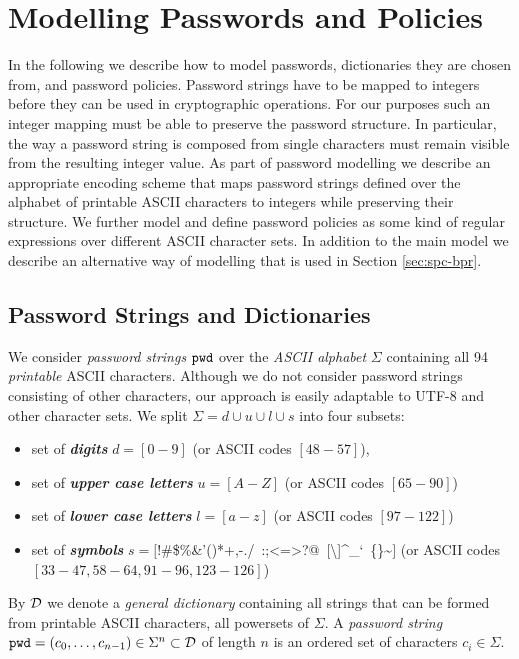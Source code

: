 \section{Modelling Passwords and Policies} \label{sec:passwords}

In the following we describe how to model passwords, dictionaries they are chosen from, and password policies. 
Password strings have to be mapped to integers before they can be used in cryptographic operations. 
For our purposes such an integer mapping must be able to preserve the password structure. 
In particular, the way a password string is composed from single characters must remain visible from the resulting integer value. 
As part of password modelling we describe an appropriate encoding scheme that maps password strings defined over the alphabet of printable \ac{ASCII} characters to integers while preserving their structure. 
We further model and define password policies as some kind of regular expressions over different \ac{ASCII} character sets.
In addition to the main model we describe an alternative way of modelling that is used in Section \ref{sec:spc-bpr}.

\subsection{Password Strings and Dictionaries}
We consider \emph{password strings} $\mathtt{pwd}$ over the \emph{\ac{ASCII}  alphabet} $\Sigma$ containing all 94 \emph{printable} \ac{ASCII}  characters.
Although we do not consider password strings consisting of other characters, our approach is easily adaptable to \ac{UTF-8} and other character sets.
We split $\Sigma=d\cup u\cup l\cup s$ into four subsets:
\begin{itemize}
	\item set of \emph{\bf digits} $d=[0-9]$ (or \ac{ASCII}  codes $[48-57]$),
	\item set of \emph{\bf upper case letters} $u=[A-Z]$ (or \ac{ASCII}  codes $[65-90]$)
	\item set of \emph{\bf lower case letters} $l=[a-z]$ (or \ac{ASCII}  codes $[97-122]$)
	\item set of \emph{\bf symbols} $s=[$!\textquotedbl\#\$\%\&'()*+,-./~:;\textless=\textgreater?@~[\textbackslash]\^{}\_`~\{\textbar\}\textasciitilde$]$ (or \ac{ASCII}  codes $[33-47,58-64,91-96,123-126]$)
\end{itemize}

\noindent
By $\mathcal{D}$ we denote a \emph{general dictionary} containing all strings that can be formed from printable \ac{ASCII}  characters, \ie all powersets of $\Sigma$.
A \emph{password string} $\mathtt{pwd}=(c_{0},\dots,c_{n-1})\in\Sigma^n\subset\mathcal{D}$ of length $n$ is an ordered set of characters $c_i\in\Sigma$.

